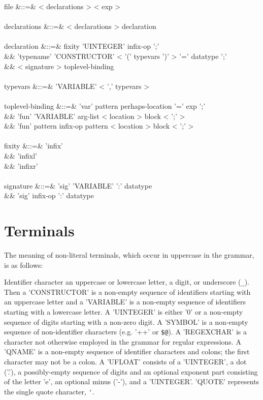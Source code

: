 \documentclass[11pt,a4paper]{article}
\begin{document}
\begin{grammar}
file &::=& < declarations > < exp > \\
\\
declarations &::=& < declarations > declaration \\
\\
declaration &::=& fixity 'UINTEGER' infix-op ';' \\
&&               'typename' 'CONSTRUCTOR' < '(' typevars ')' > '=' datatype ';' \\
&&                < signature > toplevel-binding \\
\\
typevars &::=& 'VARIABLE' < ',' typevars > \\
\\
toplevel-binding &::=& 'var' pattern perhaps-location '=' exp ';' \\
&&                     'fun' 'VARIABLE' arg-list < location > block < ';' > \\
&&                     'fun' pattern infix-op pattern < location > block < ';' > \\
\\
fixity &::=& 'infix' \\
&&           'infixl' \\
&&           'infixr' \\
\\
signature &::=& 'sig' 'VARIABLE' ':' datatype \\
&&              'sig' infix-op ':' datatype \\
\end{grammar} 


\section{Terminals} 
 
\MakeShortVerb{\'} 
 
The meaning of non-literal terminals, which occur in uppercase in the 
grammar, is as follows: 
 
Identifier character an uppercase or lowercase letter, a digit, or
underscore (\texttt{\_}).  Then a 'CONSTRUCTOR' is a non-empty
sequence of identifiers starting with an uppercase letter and a
'VARIABLE' is a non-empty sequence of identifiers starting with a
lowercase letter.  A 'UINTEGER' is either '0' or a non-empty sequence
of digits starting with a non-zero digit.  A 'SYMBOL' is a non-empty
sequence of non-identifier characters (e.g. '++' or \texttt{\$@}).  A
'REGEXCHAR' is a character not otherwise employed in the grammar for
regular expressions.  A 'QNAME' is a non-empty sequence of identifier
characters and colons; the first character may not be a colon.  A
'UFLOAT' consists of a 'UINTEGER', a dot ('.'), a possibly-empty
sequence of digits and an optional exponent part consisting of the
letter 'e', an optional minus ('-'), and a 'UINTEGER'.  'QUOTE'
represents the single quote character, \verb$'$.
 
\end{document}
